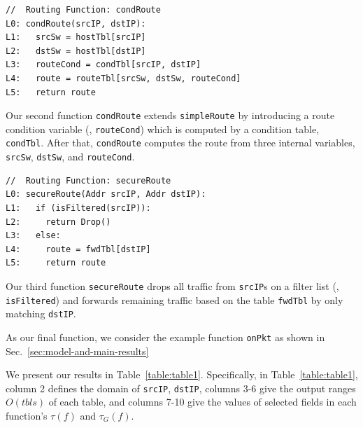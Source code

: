 {\small
\begin{verbatim}
//  Routing Function: condRoute
L0: condRoute(srcIP, dstIP):
L1:   srcSw = hostTbl[srcIP]
L2:   dstSw = hostTbl[dstIP]
L3:   routeCond = condTbl[srcIP, dstIP]
L4:   route = routeTbl[srcSw, dstSw, routeCond]
L5:   return route
\end{verbatim}
}

Our second function \texttt{condRoute} extends \texttt{simpleRoute} by introducing a route condition variable (\ie, \texttt{routeCond}) which is computed by a condition table, \texttt{condTbl}. After that, \texttt{condRoute} computes the route from three internal variables, 
\texttt{srcSw}, \texttt{dstSw}, and \texttt{routeCond}.


{\small
\begin{verbatim}
//  Routing Function: secureRoute
L0: secureRoute(Addr srcIP, Addr dstIP):
L1:   if (isFiltered(srcIP)):
L2:     return Drop()
L3:   else:
L4:     route = fwdTbl[dstIP]
L5:     return route
\end{verbatim}
}

Our third function \texttt{secureRoute} drops all traffic from \texttt{srcIP}s on a filter list (\ie, \texttt{isFiltered}) and forwards remaining traffic based on the table \texttt{fwdTbl} by only matching \texttt{dstIP}.

As our final function, we consider the example function \texttt{onPkt} as shown in Sec.~\ref{sec:model-and-main-results}

 We present our results in Table~\ref{table:table1}. Specifically, in Table~\ref{table:table1}, column 2 defines the domain of \texttt{srcIP}, \texttt{dstIP}, columns 3-6 give the output ranges $O(tbls)$ of each table, and columns 7-10 give the values of selected fields in each function's $\tau(f)$ and $\tau_G(f)$. 

